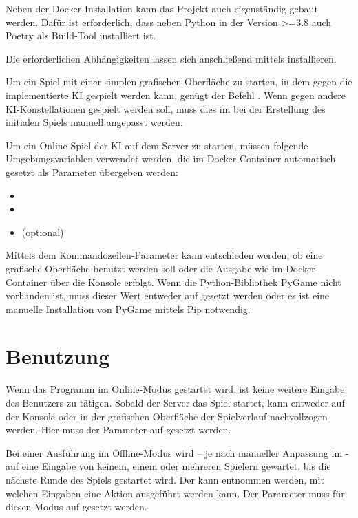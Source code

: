 Neben der Docker-Installation kann das Projekt auch eigenständig gebaut werden.
Dafür ist erforderlich, dass neben Python in der Version >=3.8 auch Poetry als Build-Tool installiert ist.

Die erforderlichen Abhängigkeiten lassen sich anschließend mittels  installieren.

Um ein Spiel mit einer simplen grafischen Oberfläche zu starten, in dem gegen die implementierte \ac{KI} gespielt
werden kann, genügt der Befehl .
Wenn gegen andere \ac{KI}-Konstellationen gespielt werden soll, muss dies im  bei der Erstellung
des initialen Spiels manuell angepasst werden.

Um ein Online-Spiel der KI auf dem Server zu starten, müssen folgende Umgebungsvariablen verwendet werden, die im
Docker-Container automatisch gesetzt \bzw als Parameter übergeben werden:

\begin{itemize}
	\item {}
	\item {}
	\item {} (optional)
\end{itemize}

Mittels dem Kommandozeilen-Parameter  kann entschieden werden, ob eine grafische Oberfläche
benutzt werden soll oder die Ausgabe wie im Docker-Container über die Konsole erfolgt.
Wenn die Python-Bibliothek PyGame nicht vorhanden ist, muss dieser Wert entweder auf  gesetzt werden oder
es ist eine manuelle Installation von PyGame \bspw mittels Pip notwendig.

\section{Benutzung}
\label{sec:benutzung}

Wenn das Programm im Online-Modus gestartet wird, ist keine weitere Eingabe des Benutzers zu tätigen.
Sobald der Server das Spiel startet, kann entweder auf der Konsole oder in der grafischen Oberfläche der Spielverlauf
nachvollzogen werden.
Hier muss der Parameter  auf  gesetzt werden.

Bei einer Ausführung im Offline-Modus wird – je nach manueller Anpassung im  - auf eine
Eingabe von keinem, einem oder mehreren Spielern gewartet, bis die nächste Runde des Spiels gestartet wird.
Der  kann entnommen werden, mit welchen Eingaben eine Aktion ausgeführt werden kann.
Der Parameter  muss für diesen Modus auf  gesetzt werden.

